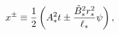 \begin{equation}
x^{\pm}\equiv {1\over 2}\left( A^{2}_{*} t
\pm {\tilde{B}^{2}_{*}r^{2}_{*}\over \ell_{*}}\psi \right),
\label{eq:coordtr}
\end{equation}


